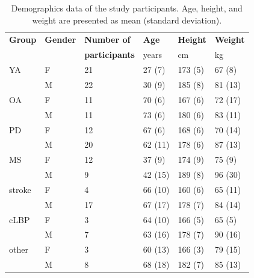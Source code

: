 \documentclass[sensors,article,submit,pdftex,moreauthors]{Definitions/mdpi}
\begin{document}
\begin{table}[H] 
	\caption{\label{tab:demographics_data}Demographics data of the study participants. Age, height, and weight are presented as mean (standard deviation).}
	\begin{tabularx}{\textwidth}{CCCCCC}
		\toprule
		\textbf{Group}	& \textbf{Gender}	& \textbf{Number of}	& \textbf{Age}	& \textbf{Height}	& \textbf{Weight}\\
		 & & \textbf{participants} & years	& cm	& kg\\
		\midrule
		YA		& F		& 21	& 27 (7)	& 173 (5)	& 67 (8)\\
		 & M	& 22	& 30 (9)	& 185 (8) & 81 (13)\\ 
		\midrule
		OA		& F		& 11	& 70 (6)	& 167 (6)	& 72 (17)\\
		 & M	& 11	& 73 (6)	& 180 (6) & 83 (11)\\
		\midrule
		PD		& F		& 12	& 67 (6)	& 168 (6)	& 70 (14)\\
		 & M	& 20	& 62 (11)	& 178 (6) & 87 (13)\\
		\midrule
		MS		& F		& 12	& 37 (9)	& 174 (9)	& 75 (9)\\
		 & M	& 9	& 42 (15)	& 189 (8) & 96 (30)\\
		\midrule
		stroke	& F		& 4	& 66 (10)	& 160 (6)	& 65 (11)\\
		 & M	& 17	& 67 (17)	& 178 (7) & 84 (14)\\
		\midrule
		cLBP	& F		& 3	& 64 (10)	& 166 (5)	& 65 (5)\\
		 & M	& 7	& 63 (16)	& 178 (7) & 90 (16)\\ 
		\midrule
		other	& F		& 3	& 60 (13)	& 166 (3)	& 79 (15)\\
		 & M	& 8	& 68 (18)	& 182 (7) & 85 (13)\\ 
		\bottomrule
	\end{tabularx}
\end{table}
\end{document}
